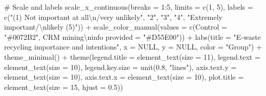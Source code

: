 \documentclass[
  letterpaper,
  DIV=11,
  numbers=noendperiod]{scrartcl}
\newenvironment{Shaded}{\begin{snugshade}}{\end{snugshade}}
\newcommand{\AttributeTok}[1]{\textcolor[rgb]{0.40,0.45,0.13}{#1}}
\newcommand{\CommentTok}[1]{\textcolor[rgb]{0.37,0.37,0.37}{#1}}
\newcommand{\ConstantTok}[1]{\textcolor[rgb]{0.56,0.35,0.01}{#1}}
\newcommand{\DecValTok}[1]{\textcolor[rgb]{0.68,0.00,0.00}{#1}}
\newcommand{\FloatTok}[1]{\textcolor[rgb]{0.68,0.00,0.00}{#1}}
\newcommand{\FunctionTok}[1]{\textcolor[rgb]{0.28,0.35,0.67}{#1}}
\newcommand{\NormalTok}[1]{\textcolor[rgb]{0.00,0.23,0.31}{#1}}
\newcommand{\OtherTok}[1]{\textcolor[rgb]{0.00,0.23,0.31}{#1}}
\newcommand{\SpecialCharTok}[1]{\textcolor[rgb]{0.37,0.37,0.37}{#1}}
\newcommand{\StringTok}[1]{\textcolor[rgb]{0.13,0.47,0.30}{#1}}
\begin{document}
\begin{Shaded}
\begin{Highlighting}[]
  \CommentTok{\# Scale and labels}
  \FunctionTok{scale\_x\_continuous}\NormalTok{(}\AttributeTok{breaks =} \DecValTok{1}\SpecialCharTok{:}\DecValTok{5}\NormalTok{, }\AttributeTok{limits =} \FunctionTok{c}\NormalTok{(}\DecValTok{1}\NormalTok{, }\DecValTok{5}\NormalTok{),}
                     \AttributeTok{labels =} \FunctionTok{c}\NormalTok{(}\StringTok{"(1) Not important at all}\SpecialCharTok{\textbackslash{}n}\StringTok{/very unlikely"}\NormalTok{, }\StringTok{"2"}\NormalTok{, }\StringTok{"3"}\NormalTok{, }\StringTok{"4"}\NormalTok{, }\StringTok{"Extremely important/}\SpecialCharTok{\textbackslash{}n}\StringTok{likely (5)"}\NormalTok{)) }\SpecialCharTok{+}
  \FunctionTok{scale\_color\_manual}\NormalTok{(}\AttributeTok{values =} \FunctionTok{c}\NormalTok{(}\AttributeTok{Control =} \StringTok{"\#0072B2"}\NormalTok{, }\StringTok{\textasciigrave{}}\AttributeTok{CRM mining}\SpecialCharTok{\textbackslash{}n}\AttributeTok{info provided}\StringTok{\textasciigrave{}} \OtherTok{=} \StringTok{"\#D55E00"}\NormalTok{)) }\SpecialCharTok{+}
  \FunctionTok{labs}\NormalTok{(}\AttributeTok{title =} \StringTok{"E{-}waste recycling importance and intentions"}\NormalTok{,}
       \AttributeTok{x =} \ConstantTok{NULL}\NormalTok{, }\AttributeTok{y =} \ConstantTok{NULL}\NormalTok{, }\AttributeTok{color =} \StringTok{"Group"}\NormalTok{) }\SpecialCharTok{+}
  \FunctionTok{theme\_minimal}\NormalTok{() }\SpecialCharTok{+}
  \FunctionTok{theme}\NormalTok{(}\AttributeTok{legend.title =} \FunctionTok{element\_text}\NormalTok{(}\AttributeTok{size =} \DecValTok{11}\NormalTok{), }\AttributeTok{legend.text =} \FunctionTok{element\_text}\NormalTok{(}\AttributeTok{size =} \DecValTok{10}\NormalTok{),}
        \AttributeTok{legend.key.size =} \FunctionTok{unit}\NormalTok{(}\FloatTok{0.8}\NormalTok{, }\StringTok{"lines"}\NormalTok{), }\AttributeTok{axis.text.y =} \FunctionTok{element\_text}\NormalTok{(}\AttributeTok{size =} \DecValTok{10}\NormalTok{),}
        \AttributeTok{axis.text.x =} \FunctionTok{element\_text}\NormalTok{(}\AttributeTok{size =} \DecValTok{10}\NormalTok{), }\AttributeTok{plot.title =} \FunctionTok{element\_text}\NormalTok{(}\AttributeTok{size =} \DecValTok{15}\NormalTok{, }\AttributeTok{hjust =} \FloatTok{0.5}\NormalTok{))}
\end{Highlighting}
\end{Shaded}
\end{document}
